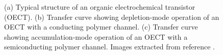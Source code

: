 \begin{figure}[ht]
	\centering
	\qquad
	\caption{(a) Typical structure of an organic electrochemical transistor (OECT). (b) Transfer curve showing depletion-mode operation of an OECT with a conducting polymer channel. (c) Transfer curve showing accumulation-mode operation of an OECT with a semiconducting polymer channel. Images extracted from reference \cite{rivnayOrganicElectrochemicalTransistors2018}.}
	\label{fig:modes}
\end{figure}

